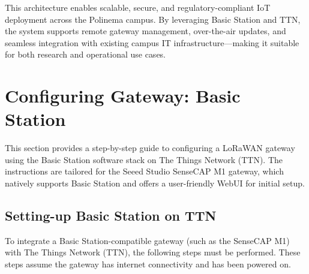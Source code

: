 This architecture enables scalable, secure, and regulatory-compliant IoT deployment across the Polinema campus. By leveraging Basic Station and TTN, the system supports remote gateway management, over-the-air updates, and seamless integration with existing campus IT infrastructure—making it suitable for both research and operational use cases.



\section{Configuring Gateway: Basic Station}
\label{sec:configuring_gateway_basic_station}

This section provides a step-by-step guide to configuring a LoRaWAN gateway using the Basic Station software stack on The Things Network (TTN). The instructions are tailored for the Seeed Studio SenseCAP M1 gateway, which natively supports Basic Station and offers a user-friendly WebUI for initial setup.

\subsection{Setting-up Basic Station on TTN}
\label{subsec:basic_station_ttn_setup}

To integrate a Basic Station-compatible gateway (such as the SenseCAP M1) with The Things Network (TTN), the following steps must be performed. These steps assume the gateway has internet connectivity and has been powered on.

